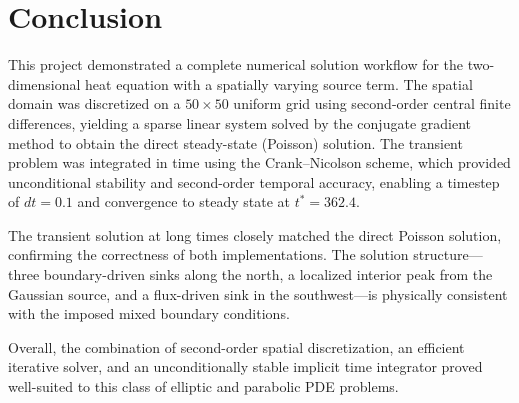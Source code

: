 \documentclass[
  aapm,
  amsmath,amssymb,
  reprint,          %
  floatfix
]{revtex4-2}
\begin{document}
\section{Conclusion}

This project demonstrated a complete numerical solution workflow for the two-dimensional
heat equation with a spatially varying source term. The spatial domain was discretized
on a $50\times50$ uniform grid using second-order central finite differences, yielding a
sparse linear system solved by the conjugate gradient method to obtain the direct
steady-state (Poisson) solution. The transient problem was integrated in time using the
Crank--Nicolson scheme, which provided unconditional stability and second-order temporal
accuracy, enabling a timestep of $dt = 0.1$ and convergence to steady state at
$t^* = 362.4$.

The transient solution at long times closely matched the direct Poisson solution,
confirming the correctness of both implementations. The solution structure—three
boundary-driven sinks along the north, a localized interior peak from the Gaussian source,
and a flux-driven sink in the southwest—is physically consistent with the imposed mixed
boundary conditions.

Overall, the combination of second-order spatial discretization, an efficient iterative
solver, and an unconditionally stable implicit time integrator proved well-suited to this
class of elliptic and parabolic PDE problems.



\end{document}
